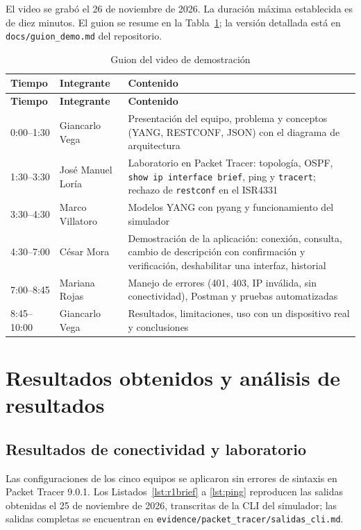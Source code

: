 El video se grabó el 26 de noviembre de 2026. La duración máxima establecida es de diez minutos. El guion se resume en la Tabla~\ref{tab:guion}; la versión detallada está en \texttt{docs/guion\_demo.md} del repositorio.

\begin{longtable}{p{2.1cm}p{3.6cm}p{8.4cm}}
\caption{Guion del video de demostración}\label{tab:guion}\\
\toprule
\textbf{Tiempo} & \textbf{Integrante} & \textbf{Contenido} \\
\midrule
\endfirsthead
\toprule
\textbf{Tiempo} & \textbf{Integrante} & \textbf{Contenido} \\
\midrule
\endhead
0:00--1:30 & Giancarlo Vega & Presentación del equipo, problema y conceptos (YANG, RESTCONF, JSON) con el diagrama de arquitectura \\
1:30--3:30 & José Manuel Loría & Laboratorio en Packet Tracer: topología, OSPF, \texttt{show ip interface brief}, ping y \texttt{tracert}; rechazo de \texttt{restconf} en el ISR4331 \\
3:30--4:30 & Marco Villatoro & Modelos YANG con pyang y funcionamiento del simulador \\
4:30--7:00 & César Mora & Demostración de la aplicación: conexión, consulta, cambio de descripción con confirmación y verificación, deshabilitar una interfaz, historial \\
7:00--8:45 & Mariana Rojas & Manejo de errores (401, 403, IP inválida, sin conectividad), Postman y pruebas automatizadas \\
8:45--10:00 & Giancarlo Vega & Resultados, limitaciones, uso con un dispositivo real y conclusiones \\
\bottomrule
\end{longtable}

\section{Resultados obtenidos y análisis de resultados}

\subsection{Resultados de conectividad y laboratorio}
Las configuraciones de los cinco equipos se aplicaron sin errores de sintaxis en Packet Tracer 9.0.1. Los Listados~\ref{lst:r1brief} a \ref{lst:ping} reproducen las salidas obtenidas el 25 de noviembre de 2026, transcritas de la CLI del simulador; las salidas completas se encuentran en \texttt{evidence/packet\_tracer/salidas\_cli.md}.

